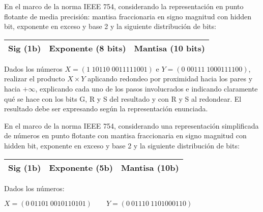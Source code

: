 \documentclass[12pt,a4paper]{article}
\begin{document}


 En el marco de la norma IEEE 754, considerando la representación en punto flotante de media precisión: mantisa fraccionaria en signo magnitud con hidden bit, exponente en exceso y base 2 y la siguiente distribución de bits:
\begin{center}
	\begin{tabular}{|c|c|c|}\hline
		Sig (1b) & Exponente (8 bits) & Mantisa (10 bits)\\\hline
	\end{tabular}
\end{center}

Dados los números $X = (1\; 10110\; 0011111001)$ e $Y = (0\; 00111\; 1000111100)$, realizar el producto $X \times Y$ aplicando redondeo por proximidad hacia los pares y hacia $+\infty$, explicando cada uno de los pasos involucrados e indicando claramente qué se hace con los bits G, R y S del resultado y con R y S al redondear. El resultado debe ser expresando según la representación enunciada.

%
%

 En el marco de la norma IEEE 754, considerando una representación simplificada de números en punto flotante con mantisa fraccionaria en signo magnitud con hidden bit, exponente en exceso y base 2 y la siguiente distribución de bits:\begin{center}
	\begin{tabular}{|c|c|c|} \hline Sig (1b) & Exponente (5b) & Mantisa (10b) \\\hline\end{tabular}
\end{center}
Dados los números:
\begin{center}
	$X = (0 \ 01101 \ 0010110101) \qquad Y = (0 \ 01110 \ 1101000110)$
\end{center}
\end{document}
